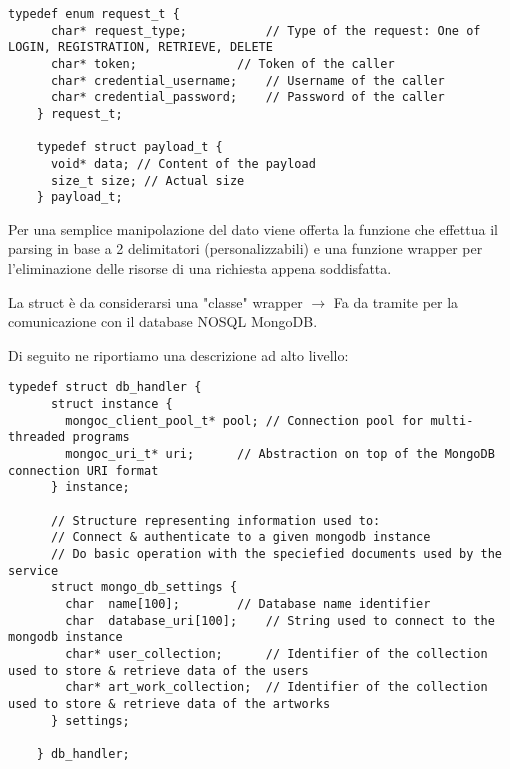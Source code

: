   \begin{lstlisting}[language={[POSIX]C}, style=wnumbers]
    typedef enum request_t {
      char* request_type;	        // Type of the request: One of LOGIN, REGISTRATION, RETRIEVE, DELETE
      char* token;		        // Token of the caller
      char* credential_username;	// Username of the caller
      char* credential_password;	// Password of the caller
    } request_t;

    typedef struct payload_t {
      void* data; // Content of the payload
      size_t size; // Actual size
    } payload_t;
  \end{lstlisting}

  Per una semplice manipolazione del dato viene offerta la funzione  che effettua il parsing in base a 2 delimitatori (personalizzabili) e una funzione wrapper  per l'eliminazione delle risorse di una richiesta appena soddisfatta.

  \begin{center}  \end{center}

  La struct  è da considerarsi una "classe" wrapper \footnotemark {} $\rightarrow$ Fa da tramite per la comunicazione con il database NOSQL MongoDB.

  Di seguito ne riportiamo una descrizione ad alto livello:

  \begin{lstlisting}[language={[POSIX]C}, style=wnumbers]
    typedef struct db_handler {
      struct instance {
        mongoc_client_pool_t* pool;	// Connection pool for multi-threaded programs
        mongoc_uri_t* uri;		// Abstraction on top of the MongoDB connection URI format
      } instance;

      // Structure representing information used to:
      // Connect & authenticate to a given mongodb instance
      // Do basic operation with the speciefied documents used by the service
      struct mongo_db_settings {
        char  name[100];		// Database name identifier
        char  database_uri[100];	// String used to connect to the mongodb instance
        char* user_collection;		// Identifier of the collection used to store & retrieve data of the users
        char* art_work_collection;	// Identifier of the collection used to store & retrieve data of the artworks
      } settings;

    } db_handler;
  \end{lstlisting}

